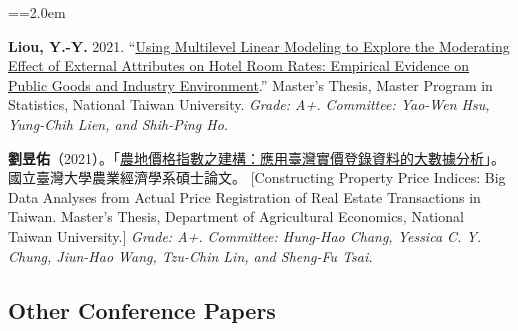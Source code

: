 \documentclass[11pt,letterpaper]{article}
\newenvironment{hanglist}{\par\setlength{\parindent}{0pt}\everypar={\hangindent=2.0em\hangafter=1}}{\par}
\begin{document}
\begin{hanglist}

\textbf{Liou, Y.-Y.} 2021.
``\href{https://doi.org/10.6342/NTU202102085}{Using Multilevel Linear
Modeling to Explore the Moderating Effect of External Attributes on
Hotel Room Rates: Empirical Evidence on Public Goods and Industry
Environment}.'' Master's Thesis, Master Program in Statistics, National
Taiwan University.
\newline \textit{Grade: A+. Committee: Yao-Wen Hsu, Yung-Chih Lien, and Shih-Ping Ho.}

\textbf{劉昱佑}（2021）。「\href{https://doi.org/10.6342/NTU202101981}{農地價格指數之建構：應用臺灣實價登錄資料的大數據分析}」。國立臺灣大學農業經濟學系碩士論文。
\newline{} {[}Constructing Property Price Indices: Big Data Analyses
from Actual Price Registration of Real Estate Transactions in Taiwan.
Master's Thesis, Department of Agricultural Economics, National Taiwan
University.{]}
\newline \textit{Grade: A+. Committee: Hung-Hao Chang, Yessica C. Y. Chung, Jiun-Hao Wang, Tzu-Chin Lin, and Sheng-Fu Tsai.}

\end{hanglist}

\subsection{Other Conference Papers}\label{other-conference-papers}
\end{document}

